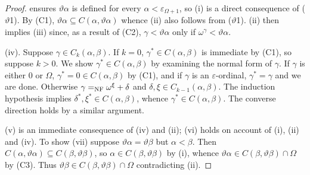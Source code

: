 \documentclass[UKenglish,cleveref,DIV=12]{scrartcl}
\theoremstyle{definition}
\theoremstyle{definition}
\begin{document}
\begin{proof}
 ensures $\vartheta\alpha$ is defined for every
$\alpha<\varepsilon_{\Omega+1}$, so (i) is a direct consequence of ($\vartheta$1). By (C1),
$\vartheta\alpha\subseteq C(\alpha,\vartheta\alpha)$ whence (ii) also follows
from ($\vartheta$1). (ii) then implies (iii) since, as a result of (C2),
$\gamma<\vartheta\alpha$ only if $\omega^\gamma<\vartheta\alpha$.

(iv). Suppose $\gamma\in C_k(\alpha,\beta)$. If $k=0$, $\gamma^*\in C(\alpha,\beta)$ is immediate by (C1), so suppose $k>0$.
We show $\gamma^*\in C(\alpha,\beta)$ by
examining the normal form of $\gamma$. If $\gamma$ is either $0$ or $\Omega$,
$\gamma^*=0\in C(\alpha,\beta)$ by (C1), and if $\gamma$ is an $\varepsilon$-ordinal,
$\gamma^*=\gamma$ and we are done. Otherwise
$\gamma=_{\mathrm{NF}}\omega^{\xi}+\delta$ and $\delta,\xi\in C_{k-1}(\alpha,\beta)$. The
induction hypothesis implies $\delta^*,\xi^*\in C(\alpha,\beta)$, whence
$\gamma^*\in C(\alpha,\beta)$. The converse direction holds by a similar argument.

(v) is an immediate consequence of (iv) and (ii); (vi) holds on account of (i),
(ii) and (iv). To show (vii) suppose $\vartheta\alpha=\vartheta\beta$ but
$\alpha<\beta$. Then $C(\alpha,\vartheta\alpha)\subseteq
C(\beta,\vartheta\beta)$, so $\alpha\in C(\beta,\vartheta\beta)$ by (i), whence
$\vartheta\alpha\in C(\beta,\vartheta\beta)\cap\Omega$ by (C3). Thus
$\vartheta\beta\in C(\beta,\vartheta\beta)\cap\Omega$ contradicting (ii).


\end{proof}
\end{document}
